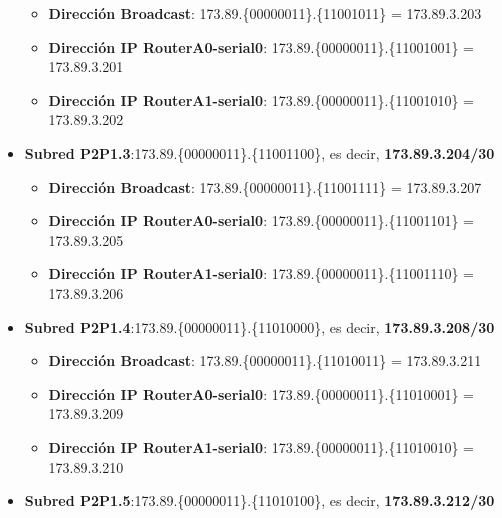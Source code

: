 \begin{itemize}
		\begin{itemize}
			\item{\textbf{Dirección Broadcast}}: 173.89.\{\textcolor{azul}{000000}\textcolor{rojo}{11}\}.\{\textcolor{rojo}{110010}11\} = 173.89.3.203
			\item{\textbf{Dirección IP RouterA0-serial0}}: 173.89.\{\textcolor{azul}{000000}\textcolor{rojo}{11}\}.\{\textcolor{rojo}{110010}01\} = 173.89.3.201
			\item{\textbf{Dirección IP RouterA1-serial0}}: 173.89.\{\textcolor{azul}{000000}\textcolor{rojo}{11}\}.\{\textcolor{rojo}{110010}10\} = 173.89.3.202
		\end{itemize}
	\item{\textbf{Subred P2P1.3}:}173.89.\{\textcolor{azul}{000000}\textcolor{rojo}{11}\}.\{\textcolor{rojo}{110011}00\}, es decir, \textbf{173.89.3.204/30}
		\begin{itemize}
			\item{\textbf{Dirección Broadcast}}: 173.89.\{\textcolor{azul}{000000}\textcolor{rojo}{11}\}.\{\textcolor{rojo}{110011}11\} = 173.89.3.207
			\item{\textbf{Dirección IP RouterA0-serial0}}: 173.89.\{\textcolor{azul}{000000}\textcolor{rojo}{11}\}.\{\textcolor{rojo}{110011}01\} = 173.89.3.205
			\item{\textbf{Dirección IP RouterA1-serial0}}: 173.89.\{\textcolor{azul}{000000}\textcolor{rojo}{11}\}.\{\textcolor{rojo}{110011}10\} = 173.89.3.206
		\end{itemize}
	\item{\textbf{Subred P2P1.4}:}173.89.\{\textcolor{azul}{000000}\textcolor{rojo}{11}\}.\{\textcolor{rojo}{110100}00\}, es decir, \textbf{173.89.3.208/30}
		\begin{itemize}
			\item{\textbf{Dirección Broadcast}}: 173.89.\{\textcolor{azul}{000000}\textcolor{rojo}{11}\}.\{\textcolor{rojo}{110100}11\} = 173.89.3.211
			\item{\textbf{Dirección IP RouterA0-serial0}}: 173.89.\{\textcolor{azul}{000000}\textcolor{rojo}{11}\}.\{\textcolor{rojo}{110100}01\} = 173.89.3.209
			\item{\textbf{Dirección IP RouterA1-serial0}}: 173.89.\{\textcolor{azul}{000000}\textcolor{rojo}{11}\}.\{\textcolor{rojo}{110100}10\} = 173.89.3.210
		\end{itemize}
	\item{\textbf{Subred P2P1.5}:}173.89.\{\textcolor{azul}{000000}\textcolor{rojo}{11}\}.\{\textcolor{rojo}{110101}00\}, es decir, \textbf{173.89.3.212/30}

\end{itemize}
